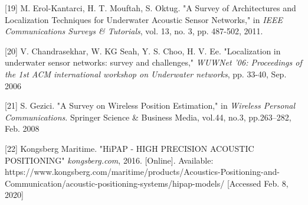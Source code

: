 [19] M. Erol-Kantarci, H. T. Mouftah, S. Oktug. "A Survey of Architectures and Localization Techniques for Underwater Acoustic Sensor Networks," in \textit{IEEE Communications Surveys \& Tutorials}, vol. 13, no. 3, pp. 487-502, 2011.
\label{r:arch_localiz}

[20] V. Chandrasekhar, W. KG Seah, Y. S. Choo, H. V. Ee. "Localization in underwater sensor networks: survey and challenges," \textit{WUWNet '06: Proceedings of the 1st ACM international workshop on Underwater networks}, pp. 33-40, Sep. 2006
\label{r:suvey-loc}

[21] S. Gezici. "A Survey on Wireless Position Estimation," in \textit{Wireless Personal Communications}. Springer Science \& Business Media, vol.44, no.3, pp.263–282, Feb. 2008
\label{r:wirelesscomm}

[22] Kongsberg Maritime. "HiPAP - HIGH PRECISION ACOUSTIC POSITIONING"  \textit{kongsberg.com}, 2016. [Online]. Available: https://www.kongsberg.com/maritime/products/Acoustics-Positioning-and-Communication/acoustic-positioning-systems/hipap-models/ [Accessed Feb. 8, 2020]
\label{r:hipap_hardw}

